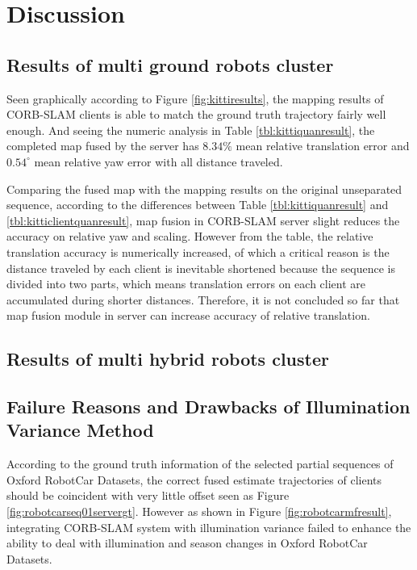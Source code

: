 
\chapter{Discussion}

\section{Results of multi ground robots cluster}
\label{sec:disussmultiground}
Seen graphically according to Figure \ref{fig:kittiresults}, the mapping results of CORB-SLAM clients is able to match the ground truth trajectory fairly well enough. And seeing the numeric analysis in Table \ref{tbl:kittiquanresult}, the completed map fused by the server has $8.34\%$ mean relative translation error and $0.54^\circ$ mean relative yaw error with all distance traveled.

Comparing the fused map with the mapping results on the original unseparated sequence, according to the differences between Table \ref{tbl:kittiquanresult} and \ref{tbl:kitticlientquanresult}, map fusion in CORB-SLAM server slight reduces the accuracy on relative yaw and scaling. However from the table, the relative translation accuracy is numerically increased, of which a critical reason is the distance traveled by each client is inevitable shortened because the sequence is divided into two parts, which means translation errors on each client are accumulated during shorter distances. Therefore, it is not concluded so far that map fusion module in server can increase accuracy of relative translation.

\section{Results of multi hybrid robots cluster}
\label{sec:disussmultihybrid}

\section{Failure Reasons and Drawbacks of Illumination Variance Method}
\label{sec:discusslifelong}

According to the ground truth information of the selected partial sequences of Oxford RobotCar Datasets, the correct fused estimate trajectories of clients should be coincident with very little offset seen as Figure \ref{fig:robotcarseq01servergt}. However as shown in Figure \ref{fig:robotcarmfresult}, integrating CORB-SLAM system with illumination variance failed to enhance the ability to deal with illumination and season changes in Oxford RobotCar Datasets. 

